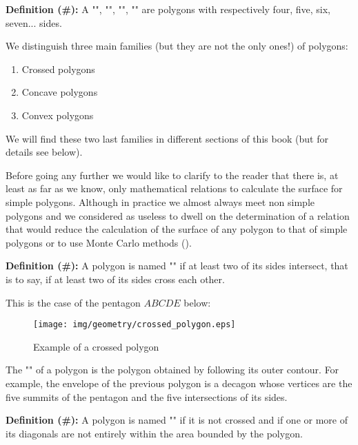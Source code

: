 {\textbf{Definition (\#\mydef):} A "", "", "", "" are polygons with respectively four, five, six, seven... sides.

We distinguish three main families (but they are not the only ones!) of polygons: 
	\begin{enumerate}
		\item Crossed polygons
		\item Concave polygons
		\item Convex polygons
	\end{enumerate}
We will find these two last families in different sections of this book (but for details see below).

Before going any further we would like to clarify to the reader that there is, at least as far as we know, only mathematical relations to calculate the surface for simple polygons. Although in practice we almost always meet non simple polygons and we considered as useless to dwell on the determination of a relation that would reduce the calculation of the surface of any polygon to that of simple polygons or to use Monte Carlo methods ().

	\textbf{Definition (\#\mydef):} A polygon is named "" if at least two of its sides intersect, that is to say, if at least two of its sides cross each other. 

This is the case of the pentagon $ABCDE$ below:

\begin{figure}[H]
\centering
\texttt{[image: img/geometry/crossed\_polygon.eps]}
\caption{Example of a crossed polygon}
\end{figure}

	\begin{tcolorbox}[title=Remark,colframe=black,arc=10pt]
The "" of a polygon is the polygon obtained by following its outer contour. For example, the envelope of  the previous polygon is a decagon whose vertices are the five summits of the pentagon and the five intersections of its sides.
	\end{tcolorbox}	

	\textbf{Definition (\#\mydef):} A polygon is named "" if it is not crossed and if one or more of its diagonals are not entirely within the area bounded by the polygon.

}
